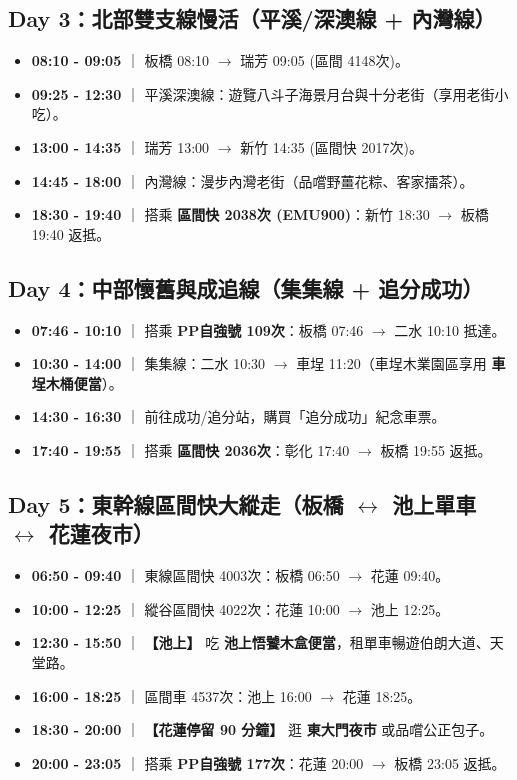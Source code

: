 \documentclass[11pt, a4paper]{article}
\begin{document}
\subsection{Day 3：北部雙支線慢活（平溪/深澳線 + 內灣線）}
\begin{itemize}
    \item \textbf{08:10 - 09:05} ｜ 板橋 08:10 $\to$ 瑞芳 09:05 (區間 4148次)。
    \item \textbf{09:25 - 12:30} ｜ 平溪深澳線：遊覽八斗子海景月台與十分老街（享用老街小吃）。
    \item \textbf{13:00 - 14:35} ｜ 瑞芳 13:00 $\to$ 新竹 14:35 (區間快 2017次)。
    \item \textbf{14:45 - 18:00} ｜ 內灣線：漫步內灣老街（品嚐野薑花粽、客家擂茶）。
    \item \textbf{18:30 - 19:40} ｜ 搭乘 \textbf{區間快 2038次 (EMU900)}：新竹 18:30 $\to$ 板橋 19:40 返抵。
\end{itemize}

\subsection{Day 4：中部懷舊與成追線（集集線 + 追分成功）}
\begin{itemize}
    \item \textbf{07:46 - 10:10} ｜ 搭乘 \textbf{PP自強號 109次}：板橋 07:46 $\to$ 二水 10:10 抵達。
    \item \textbf{10:30 - 14:00} ｜ 集集線：二水 10:30 $\to$ 車埕 11:20（車埕木業園區享用 \textbf{車埕木桶便當}）。
    \item \textbf{14:30 - 16:30} ｜ 前往成功/追分站，購買「追分成功」紀念車票。
    \item \textbf{17:40 - 19:55} ｜ 搭乘 \textbf{區間快 2036次}：彰化 17:40 $\to$ 板橋 19:55 返抵。
\end{itemize}

\subsection{Day 5：東幹線區間快大縱走（板橋 $\leftrightarrow$ 池上單車 $\leftrightarrow$ 花蓮夜市）}
\begin{itemize}
    \item \textbf{06:50 - 09:40} ｜ 東線區間快 4003次：板橋 06:50 $\to$ 花蓮 09:40。
    \item \textbf{10:00 - 12:25} ｜ 縱谷區間快 4022次：花蓮 10:00 $\to$ 池上 12:25。
    \item \textbf{12:30 - 15:50} ｜ \textbf{【池上】} 吃 \textbf{池上悟饕木盒便當}，租單車暢遊伯朗大道、天堂路。
    \item \textbf{16:00 - 18:25} ｜ 區間車 4537次：池上 16:00 $\to$ 花蓮 18:25。
    \item \textbf{18:30 - 20:00} ｜ \textbf{【花蓮停留 90 分鐘】} 逛 \textbf{東大門夜市} 或品嚐公正包子。
    \item \textbf{20:00 - 23:05} ｜ 搭乘 \textbf{PP自強號 177次}：花蓮 20:00 $\to$ 板橋 23:05 返抵。
\end{itemize}
\end{document}
